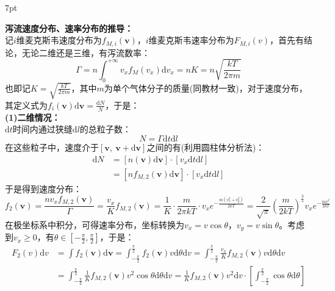\documentclass[zihao=-4,UTF8]{report}
\newenvironment{graybox}{%
\def\FrameCommand{%
\hspace{1pt}%
{\color{gray}\small \vrule width 2pt}%
{\color{graybox_color}\vrule width 4pt}%
\colorbox{graybox_color}%
}%
\MakeFramed{\advance\hsize-\width\FrameRestore}%
\noindent\hspace{-4.55pt}%
\begin{adjustwidth}{}{7pt}%
\vspace{2pt}\vspace{2pt}%
}
{%
\vspace{2pt}\end{adjustwidth}\endMakeFramed%
}
\begin{document}
\begin{graybox}
\textbf{泻流速度分布、速率分布的推导：}\\
记$i$维麦克斯韦速度分布为$f_{M,i}(\boldsymbol{v})$，$i$维麦克斯韦速率分布为$F_{M,i}(v)$，首先有结论，无论二维还是三维，有泻流数率：
\begin{equation}
    \Gamma =  n \int_{0}^{+\infty}v_xf_M(v_x)\mathrm{d}v_x =nK =n \sqrt{\frac{kT}{2\pi m}}
\end{equation}
也即记$K = \sqrt{\frac{kT}{2\pi m}}$，其中$m$为单个气体分子的质量(同教材一致)，对于速度分布，其定义式为$f_i(\boldsymbol{v}) \mathrm{d}\boldsymbol{v} = \frac{\mathrm{d}N}{N}$，于是：\\ \textbf{(1)二维情况：}\\
$\mathrm{d}t$时间内通过狭缝$\mathrm{d}l$的总粒子数：
\begin{equation}
    N = \Gamma \mathrm{d}t\mathrm{d}l
\end{equation}
在这些粒子中，速度介于$[\boldsymbol{v},\ \boldsymbol{v} + \mathrm{d}\boldsymbol{v} ]$之间的有(利用圆柱体分析法)：
\begin{align*}
    \mathrm{d}N & = \left[ n(\boldsymbol{v})\mathrm{d}\boldsymbol{v}  \right]\cdot \left[ v_x \mathrm{d}t\mathrm{d}l \right]\\
    & = \left[ nf_{M,2}(\boldsymbol{v})\mathrm{d}\boldsymbol{v}  \right]\cdot \left[ v_x \mathrm{d}t\mathrm{d}l \right]
\end{align*}
于是得到速度分布：
\begin{equation}
    f_2(\boldsymbol{v}) = \frac{nv_xf_{M,2}(\boldsymbol{v})}{\Gamma} = \frac{v_x}{K}f_{M,2}(\boldsymbol{v}) = \frac{1}{K}\cdot \frac{m}{2\pi kT}\cdot v_xe^{-\frac{m(v_x^2 + v_y^2)}{2kT}} = \frac{2}{\sqrt{\pi}} \left(\frac{m}{2kT}\right)^{\frac{3}{2}}v_xe^{-\frac{mv^2}{2kT}}
\end{equation}
在极坐标系中积分，可得速率分布，坐标转换为$v_x = v \cos \theta$，$v_y = v \sin \theta$。考虑到$v_x \ge 0 $，有$\theta \in [-\frac{\pi}{2}, \frac{\pi}{2}]$，于是：
\begin{align*}
    F_2(v)\mathrm{d}v 
    & = \int f_2(\boldsymbol{v}) \mathrm{d}\boldsymbol{v}
     = \int_{-\frac{\pi}{2}}^{\frac{\pi}{2}}f_2(\boldsymbol{v}) v \mathrm{d}\theta \mathrm{d}v 
    =   \int_{-\frac{\pi}{2}}^{\frac{\pi}{2}} \frac{v_x}{K}f_{M,2}(\boldsymbol{v}) v \mathrm{d}\theta \mathrm{d}v  \\
    & = \int_{-\frac{\pi}{2}}^{\frac{\pi}{2}} \frac{1}{K}f_{M,2}(\boldsymbol{v}) v^2 \cos \theta \mathrm{d}\theta \mathrm{d}v 
    = \frac{1}{K}f_{M,2}(\boldsymbol{v}) v^2 \mathrm{d}v \cdot \left[ \int_{-\frac{\pi}{2}}^{\frac{\pi}{2}}  \cos \theta \mathrm{d}\theta\right]\\

\end{align*}
\end{graybox}
\end{document}
